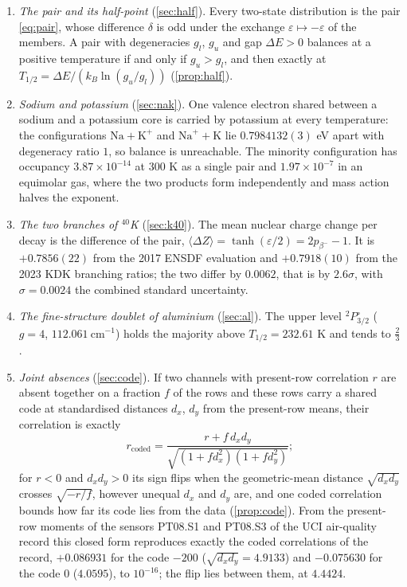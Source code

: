 \documentclass[11pt]{article}
\theoremstyle{definition}\newtheorem{definition}[theorem]{Definition}
\theoremstyle{remark}\newtheorem{remark}[theorem]{Remark}
\begin{document}
\begin{enumerate}[label=(\arabic*)]
\item \emph{The pair and its half-point} (\cref{sec:half}). Every two-state distribution is the pair \eqref{eq:pair}, whose difference $\delta$ is odd under the exchange $\varepsilon\mapsto-\varepsilon$ of the members. A pair with degeneracies $g_l$, $g_u$ and gap $\Delta E>0$ balances at a positive temperature if and only if $g_u>g_l$, and then exactly at $T_{1/2}=\Delta E/(k_B\ln(g_u/g_l))$ (\cref{prop:half}).
\item \emph{Sodium and potassium} (\cref{sec:nak}). One valence electron shared between a sodium and a potassium core is carried by potassium at every temperature: the configurations $\mathrm{Na}+\mathrm K^+$ and $\mathrm{Na}^++\mathrm K$ lie $0.7984132(3)$ eV apart with degeneracy ratio $1$, so balance is unreachable. The minority configuration has occupancy $3.87\times10^{-14}$ at 300 K as a single pair and $1.97\times10^{-7}$ in an equimolar gas, where the two products form independently and mass action halves the exponent.
\item \emph{The two branches of ${}^{40}$K} (\cref{sec:k40}). The mean nuclear charge change per decay is the difference of the pair, $\langle\Delta Z\rangle=\tanh(\varepsilon/2)=2p_{\beta^-}-1$. It is $+0.7856(22)$ from the 2017 ENSDF evaluation and $+0.7918(10)$ from the 2023 KDK branching ratios; the two differ by $0.0062$, that is by $2.6\sigma$, with $\sigma=0.0024$ the combined standard uncertainty.
\item \emph{The fine-structure doublet of aluminium} (\cref{sec:al}). The upper level ${}^2P^\circ_{3/2}$ ($g=4$, $112.061\ \mathrm{cm^{-1}}$) holds the majority above $T_{1/2}=232.61$ K and tends to $\frac23$.
\item \emph{Joint absences} (\cref{sec:code}). If two channels with present-row correlation $r$ are absent together on a fraction $f$ of the rows and these rows carry a shared code at standardised distances $d_x$, $d_y$ from the present-row means, their correlation is exactly
\[
r_{\mathrm{coded}}=\frac{r+f\,d_xd_y}{\sqrt{(1+fd_x^2)(1+fd_y^2)}};
\]
for $r<0$ and $d_xd_y>0$ its sign flips when the geometric-mean distance $\sqrt{d_xd_y}$ crosses $\sqrt{-r/f}$, however unequal $d_x$ and $d_y$ are, and one coded correlation bounds how far its code lies from the data (\cref{prop:code}). From the present-row moments of the sensors PT08.S1 and PT08.S3 of the UCI air-quality record this closed form reproduces exactly the coded correlations of the record, $+0.086931$ for the code $-200$ ($\sqrt{d_xd_y}=4.9133$) and $-0.075630$ for the code $0$ ($4.0595$), to $10^{-16}$; the flip lies between them, at $4.4424$.

\end{enumerate}
\end{document}
